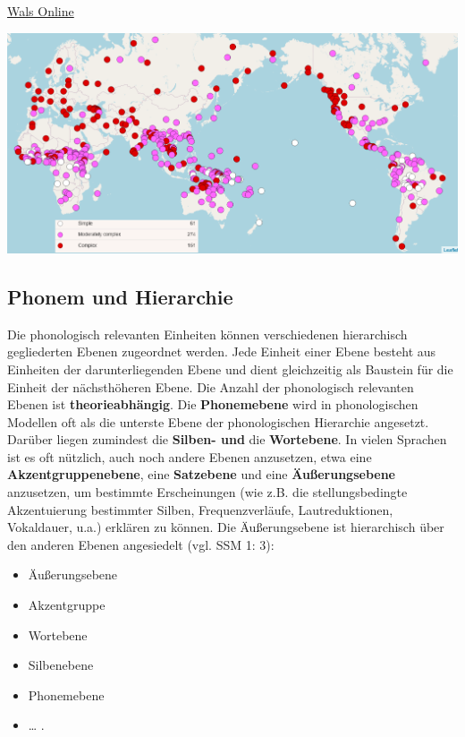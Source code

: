 \documentclass[
]{article}
\begin{document}
\href{https://wals.info/}{Wals Online}

\includegraphics[width=1\linewidth]{pictures/01b_NSG_Intro_2020-10-07/wals_syllable_structure}

\hypertarget{phonem-und-hierarchie}{%
\subsection{Phonem und Hierarchie}\label{phonem-und-hierarchie}}

Die phonologisch relevanten Einheiten können verschiedenen hierarchisch
gegliederten Ebenen zugeordnet werden. Jede Einheit einer Ebene besteht
aus Einheiten der darunterliegenden Ebene und dient gleichzeitig als
Baustein für die Einheit der nächsthöheren Ebene. Die Anzahl der
phonologisch relevanten Ebenen ist \textbf{theorieabhängig}. Die
\textbf{Phonemebene} wird in phonologischen Modellen oft als die unterste
Ebene der phonologischen Hierarchie angesetzt. Darüber liegen zumindest
die \textbf{Silben- und} die \textbf{Wortebene}. In vielen Sprachen ist es oft
nützlich, auch noch andere Ebenen anzusetzen, etwa eine
\textbf{Akzentgruppenebene}, eine \textbf{Satzebene} und eine \textbf{Äußerungsebene}
anzusetzen, um bestimmte Erscheinungen (wie z.B. die stellungsbedingte
Akzentuierung bestimmter Silben, Frequenzverläufe, Lautreduktionen,
Vokaldauer, u.a.) erklären zu können. Die Äußerungsebene ist
hierarchisch über den anderen Ebenen angesiedelt (vgl. SSM 1: 3):

\begin{itemize}
\item
  Äußerungsebene
\item
  Akzentgruppe
\item
  Wortebene
\item
  Silbenebene
\item
  Phonemebene
\item
  \ldots{} .
\end{itemize}
\end{document}
